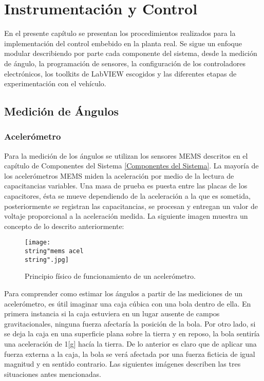 \documentclass[\main/main.tex]{subfiles}
\begin{document}
\section{Instrumentación y Control}

En el presente capítulo se presentan los procedimientos realizados
para la implementación del control embebido en la planta real. Se
sigue un enfoque modular describiendo por parte cada componente del
sistema, desde la medición de ángulo, la programación de sensores,
la configuración de los controladores electrónicos, los toolkits de
LabVIEW escogidos y las diferentes etapas de experimentación con el
vehículo.

\subsection{Medición de Ángulos}

\subsubsection{Acelerómetro}

Para la medición de los ángulos se utilizan los sensores MEMS descritos
en el capítulo de Componentes del Sistema \ref{Componentes del Sistema}. La mayoría de los acelerómetros
MEMS miden la aceleración por medio de la lectura de capacitancias
variables. Una masa de prueba es puesta entre las placas de los capacitores,
ésta se mueve dependiendo de la aceleración a la que es sometida,
posteriormente se registran las capacitancias, se procesan y entregan
un valor de voltaje proporcional a la aceleración medida. La siguiente
imagen muestra un concepto de lo descrito anteriormente:

\begin{figure}[H]
\noindent \begin{centering}
\texttt{[image: \\string"mems acel\\string".jpg]}
\par\end{centering}
\caption{Principio físico de funcionamiento de un acelerómetro.}
\end{figure}

Para comprender como estimar los ángulos a partir de las mediciones
de un acelerómetro, es útil imaginar una caja cúbica con una bola
dentro de ella. En primera instancia si la caja estuviera en un lugar
ausente de campos gravitacionales, ninguna fuerza afectaría la posición
de la bola. Por otro lado, si se deja la caja en una superficie plana
sobre la tierra y en reposo, la bola sentiría una aceleración de 1{[}g{]}
hacía la tierra. De lo anterior es claro que de aplicar una fuerza
externa a la caja, la bola se verá afectada por una fuerza ficticia
de igual magnitud y en sentido contrario. Las siguientes imágenes
describen las tres situaciones antes mencionadas.
\end{document}
